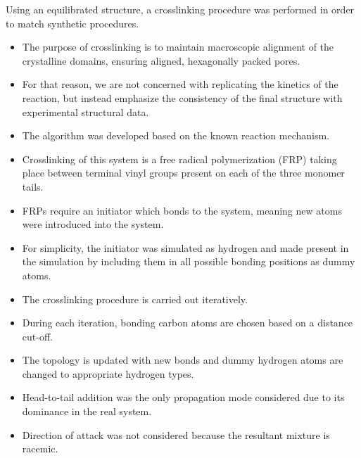 \documentclass{article}
\newcommand{\angstrom}{\textup{\AA}}
\begin{document}


  Using an equilibrated structure, a crosslinking procedure was performed
  in order to match synthetic procedures.
  \begin{itemize}
    \item The purpose of crosslinking is to maintain macroscopic alignment of
    the crystalline domains, ensuring aligned, hexagonally packed pores.
    \item For that reason, we are not concerned with replicating the kinetics
    of the reaction, but instead emphasize the consistency of the final structure
    with experimental structural data.
    \item The algorithm was developed based on the known reaction mechanism.
    \item Crosslinking of this system is a free radical polymerization (FRP)
    taking place between terminal vinyl groups present on each of the three
    monomer tails.
    \item FRPs require an initiator which bonds to the system, meaning new atoms
    were introduced into the system.
    \item For simplicity, the initiator was simulated as hydrogen and made present
    in the simulation by including them in all possible bonding positions as dummy atoms.
    \item The crosslinking procedure is carried out iteratively.
    \item During each iteration, bonding carbon atoms are chosen based on a distance cut-off.
    \item The topology is updated with new bonds and dummy hydrogen atoms are
    changed to appropriate hydrogen types.
    \item Head-to-tail addition was the only propagation mode considered due to
    its dominance in the real system.
    \item Direction of attack was not considered because the resultant mixture
    is racemic.
  \end{itemize}
\end{document}
